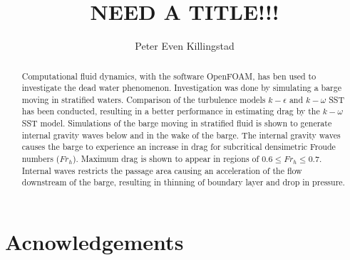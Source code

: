 \documentclass[a4paper, 12pt]{report}
\title{NEED A TITLE!!!}
\author{Peter Even Killingstad}
\begin{document}
\masterfrontpage
\begin{abstract}
Computational fluid dynamics, with the software OpenFOAM, has ben used to investigate the dead water phenomenon. Investigation was done by simulating a barge moving in stratified waters. Comparison of the turbulence models $k-\epsilon$ and $k-\omega$ SST has been conducted, resulting in a better performance in estimating drag by the $k-\omega$ SST model. Simulations of the barge moving in stratified fluid is shown to generate internal gravity waves below and in the wake of the barge. The internal gravity waves causes the barge to experience an increase in drag for subcritical densimetric Froude numbers ($Fr_h$). Maximum drag is shown to appear in regions of $0.6 \leq Fr_h \leq 0.7$. Internal waves restricts the passage area causing an acceleration of the flow downstream of the barge, resulting in thinning of boundary layer and drop in pressure.
\end{abstract}
\chapter*{Acnowledgements}

\tableofcontents
\end{document}
